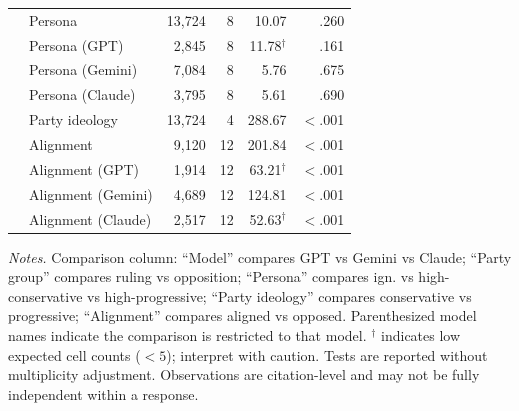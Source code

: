 \begin{table}[t]
\begin{tabular}{llrrrr}
 & Persona & 13{,}724 & 8 & 10.07 & .260 \\
 & Persona (GPT) & 2{,}845 & 8 & 11.78$^\dagger$ & .161 \\
 & Persona (Gemini) & 7{,}084 & 8 & 5.76 & .675 \\
 & Persona (Claude) & 3{,}795 & 8 & 5.61 & .690 \\
 & Party ideology & 13{,}724 & 4 & 288.67 & $<$.001 \\
 & Alignment & 9{,}120 & 12 & 201.84 & $<$.001 \\
 & Alignment (GPT) & 1{,}914 & 12 & 63.21$^\dagger$ & $<$.001 \\
 & Alignment (Gemini) & 4{,}689 & 12 & 124.81 & $<$.001 \\
 & Alignment (Claude) & 2{,}517 & 12 & 52.63$^\dagger$ & $<$.001 \\
\bottomrule
\end{tabular}
\begin{minipage}{\columnwidth}
\footnotesize \textit{Notes.} Comparison column: ``Model'' compares GPT vs Gemini vs Claude; ``Party group'' compares ruling vs opposition; ``Persona'' compares ign. vs high-conservative vs high-progressive; ``Party ideology'' compares conservative vs progressive; ``Alignment'' compares aligned vs opposed. Parenthesized model names indicate the comparison is restricted to that model. $^\dagger$ indicates low expected cell counts ($<5$); interpret with caution. Tests are reported without multiplicity adjustment. Observations are citation-level and may not be fully independent within a response.
\end{minipage}
\end{table}
